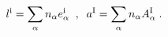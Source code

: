 \begin{equation}
l^{\rm i}=\sum_\alpha n_\alpha {e_\alpha^{\rm i}} \;\;,\;\;
a^{\rm I}=\sum_\alpha n_\alpha A_\alpha^{\rm I} \;.
\label{wl}
\end{equation}

